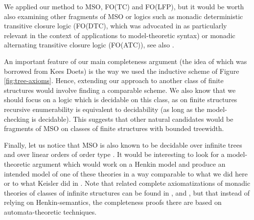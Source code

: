 \documentclass{LMCS}
\newcommand{\mso}{\textsf{MSO}\xspace}
\newcommand{\fodtc}{\textsf{FO(DTC)}\xspace}
\newcommand{\fotc}{\textsf{FO(TC)}\xspace}
\newcommand{\folfp}{\textsf{FO(LFP)}\xspace}
\newcommand{\foatc}{\textsf{FO(ATC)}\xspace}
\begin{document}
We applied our method to \mso, \fotc and \folfp, but it would be worth also examining other fragments of \mso or logics such as monadic deterministic transitive closure logic (\fodtc, which was advocated in \cite{1219706} as particularly relevant in the context of applications to model-theoretic syntax) or monadic alternating transitive closure logic (\foatc), see also \cite{1992}.


An important feature of our main completeness argument (the idea of which was borrowed from Kees Doets) is the way we used the inductive scheme of Figure \ref{fig:tree-axioms}. Hence, extending our approach to another class of finite structures would involve finding a comparable scheme. We also know that we should focus on a logic which is decidable on this class, as on finite structures recursive enumerability is equivalent to decidability (as long as the model-checking is decidable). This suggests that other natural candidates would be fragments of \mso on classes of finite structures with bounded treewidth.

Finally, let us notice that \mso is also known to be decidable over infinite trees and over linear orders of order type . It would be interesting to look for a model-theoretic argument which would work on a Henkin model and produce an intended model of one of these theories in a way comparable to what we did here or to what Keisler did in \cite{keisler}.
Note that related complete axiomatizations of monadic theories of classes of infinite structures can be found in \cite{siefkesbuchi},  \cite{siefkes} and \cite{zaiontz}, but that instead of relying on Henkin-semantics, the completeness proofs there are based on automata-theoretic techniques.
\end{document}
